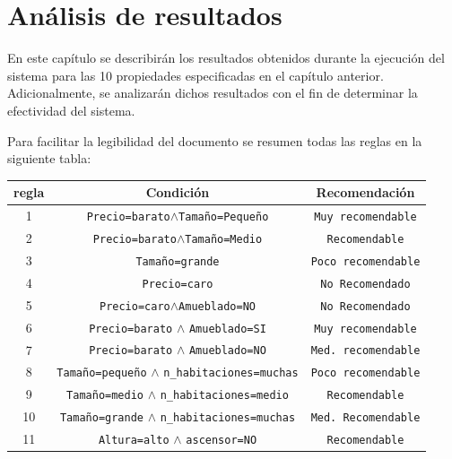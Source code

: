\documentclass[12pt]{report} %
\begin{document}
    \chapter{Análisis de resultados}
    \label{chap:resultados}

    En este capítulo se describirán los resultados obtenidos durante la
    ejecución del sistema para las 10 propiedades especificadas en el capítulo
    anterior. Adicionalmente, se analizarán dichos resultados con el fin de
    determinar la efectividad del sistema.

    Para facilitar la legibilidad del documento se resumen todas las reglas en la siguiente tabla:

    \begin{table}[H]
    \begin{tabular}{@{}ccc@{}}
        \toprule
        \textbf{regla} & \textbf{Condición} & \textbf{Recomendación}\\
        \midrule
        1  & \texttt{Precio=barato}$\land$\texttt{Tamaño=Pequeño}            & \texttt{Muy recomendable}\\
        2  & \texttt{Precio=barato}$\land$\texttt{Tamaño=Medio}              & \texttt{Recomendable}\\
        3  & \texttt{Tamaño=grande}                                        & \texttt{Poco recomendable}\\
        4  & \texttt{Precio=caro}                                          & \texttt{No Recomendado}\\
        5  & \texttt{Precio=caro}$\land$\texttt{Amueblado=NO}                & \texttt{No Recomendado}\\
        6  & \texttt{Precio=barato} $\land$ \texttt{Amueblado=SI}              & \texttt{Muy recomendable}\\
        7  & \texttt{Precio=barato} $\land$ \texttt{Amueblado=NO}              & \texttt{Med. recomendable}\\
        8  & \texttt{Tamaño=pequeño} $\land$ \texttt{n\_habitaciones=muchas}   & \texttt{Poco recomendable}\\
        9  & \texttt{Tamaño=medio} $\land$ \texttt{n\_habitaciones=medio}      & \texttt{Recomendable}\\
        10 & \texttt{Tamaño=grande} $\land$ \texttt{n\_habitaciones=muchas}    & \texttt{Med. Recomendable}\\
        11 & \texttt{Altura=alto} $\land$ \texttt{ascensor=NO}                 & \texttt{Recomendable}\\

\end{tabular}
\end{table}
\end{document}
